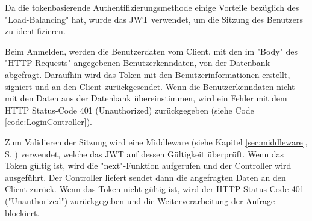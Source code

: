 
Da die tokenbasierende Authentifizierungsmethode einige Vorteile bezüglich des "Load-Balancing" hat, wurde das JWT verwendet, um die Sitzung des Benutzers zu identifizieren.



Beim Anmelden, werden die Benutzerdaten vom Client, mit den im "Body" des "HTTP-Requests" angegebenen Benutzerkenndaten, von der Datenbank abgefragt. 
Daraufhin wird das Token mit den Benutzerinformationen erstellt, signiert und an den Client zurückgesendet. \cite{NpmJWT} 
Wenn die Benutzerkenndaten nicht mit den Daten aus der Datenbank übereinstimmen, wird ein Fehler mit dem HTTP Status-Code 401 (Unauthorized) zurückgegeben (siehe Code \ref{code:LoginController}).


\pagebreak
{}

Zum Validieren der Sitzung wird eine Middleware (siehe Kapitel \ref{sec:middleware}, S. \pageref{sec:middleware}) verwendet, welche das JWT auf dessen Gültigkeit überprüft. \cite{NpmJWT} 
Wenn das Token gültig ist, wird die "next"-Funktion aufgerufen und der Controller wird ausgeführt. Der Controller liefert sendet dann die angefragten Daten an den Client zurück. 
Wenn das Token nicht gültig ist, wird der HTTP Status-Code 401 ("Unauthorized") zurückgegeben und die Weiterverarbeitung der Anfrage blockiert.

